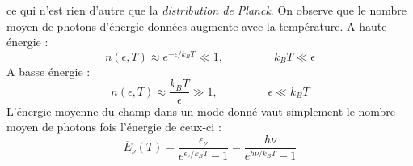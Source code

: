 \documentclass[british,french,11pt, a4paper, openany]{book}
\begin{document}
ce qui n'est rien d'autre que la \textit{distribution de Planck}. On observe que le nombre moyen de 
photons d'énergie données augmente avec la température. A  haute énergie :
\begin{equation}
	n(\epsilon,T) \approx e^{-\epsilon/k_BT} \ll 1,\ \ \ \ \ \ \ \ \ \ \ \ \ \ \ \ \ \ \ \  k_BT\ll\epsilon
\end{equation}
A basse énergie :
\begin{equation}
	n(\epsilon,T) \approx \frac{k_BT}{\epsilon} \gg 1,\ \ \ \ \ \ \ \ \ \ \ \ \ \ \ \ \ \ \ \ \epsilon\ll k_BT
\end{equation}
L'énergie moyenne du champ dans un mode donné vaut simplement le nombre moyen de photons fois l'énergie 
de ceux-ci :
\begin{equation}
	\overline{E}_\nu(T) = \dfrac{\epsilon_\nu}{e^{\epsilon_\nu/k_BT}-1} = \dfrac{h\nu}{e^{h\nu/k_BT}-1}
	\label{eq:ResQuant}
\end{equation}
\end{document}
